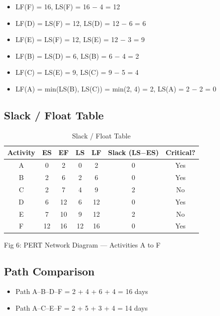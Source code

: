 \documentclass[10pt,a4paper]{article}
\begin{document}
\begin{itemize}[nosep]
    \item LF(F) = 16, LS(F) = 16 $-$ 4 = 12
    \item LF(D) = LS(F) = 12, LS(D) = 12 $-$ 6 = 6
    \item LF(E) = LS(F) = 12, LS(E) = 12 $-$ 3 = 9
    \item LF(B) = LS(D) = 6, LS(B) = 6 $-$ 4 = 2
    \item LF(C) = LS(E) = 9, LS(C) = 9 $-$ 5 = 4
    \item LF(A) = min(LS(B), LS(C)) = min(2, 4) = 2, LS(A) = 2 $-$ 2 = 0
\end{itemize}

\subsection*{Slack / Float Table}

\begin{table}[h!]
\centering
\renewcommand{\arraystretch}{1.15}
\begin{tabular}{|c|c|c|c|c|c|c|}
\hline
\textbf{Activity} & \textbf{ES} & \textbf{EF} & \textbf{LS} & \textbf{LF} & \textbf{Slack (LS$-$ES)} & \textbf{Critical?} \\ \hline
A & 0 & 2 & 0 & 2 & 0 & Yes \\ \hline
B & 2 & 6 & 2 & 6 & 0 & Yes \\ \hline
C & 2 & 7 & 4 & 9 & 2 & No \\ \hline
D & 6 & 12 & 6 & 12 & 0 & Yes \\ \hline
E & 7 & 10 & 9 & 12 & 2 & No \\ \hline
F & 12 & 16 & 12 & 16 & 0 & Yes \\ \hline
\end{tabular}
\caption*{Slack / Float Table}
\end{table}

Fig 6: PERT Network Diagram --- Activities A to F

\subsection*{Path Comparison}

\begin{itemize}[nosep]
    \item Path A--B--D--F = 2 + 4 + 6 + 4 = 16 days
    \item Path A--C--E--F = 2 + 5 + 3 + 4 = 14 days
\end{itemize}
\end{document}
